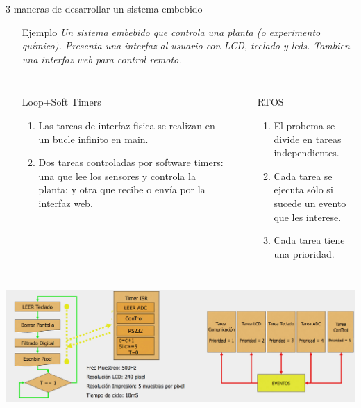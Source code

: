 \documentclass[8pt,aspectratio=169,compress]{beamer}
\begin{document}
\begin{frame}{3 maneras de desarrollar un sistema embebido}

\begin{itemize}
\item [Ejemplo] \textit{Un sistema embebido que controla una planta (o experimento químico). Presenta una interfaz al usuario con LCD, teclado y leds. Tambien una interfaz web para control remoto.}
\end{itemize}

    \begin{columns}[onlytextwidth,T]
      \column{\dimexpr\linewidth-70mm-5mm}


\begin{itemize}
\item [Loop+Soft Timers]

\begin{enumerate}
\item Las tareas de interfaz fisica se realizan en un bucle infinito en main.
\item Dos tareas controladas por software timers: una que lee los sensores y controla la planta; y otra que recibe o envía por la interfaz web.
\end{enumerate}
\end{itemize}


      \column{70mm}

\begin{itemize}
\item [RTOS]

\begin{enumerate}
\item El probema se divide en tareas independientes.
\item Cada tarea se ejecuta sólo si sucede un evento que les interese.
\item Cada tarea tiene una prioridad.
\end{enumerate}

\end{itemize}
    \end{columns}
     \includegraphics[width=140mm]{images/loop-vs-rtos.jpg}
\end{frame}
\end{document}
